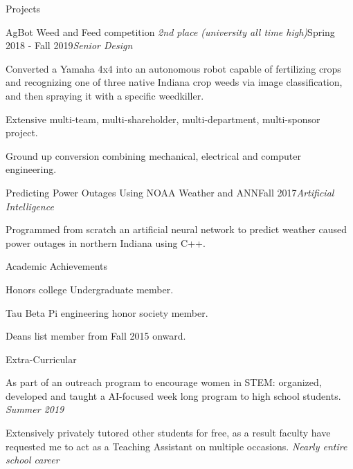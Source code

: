 \documentclass{resume}
\begin{document}
\begin{rSection}{Projects}
\begin{rSubsection}{AgBot Weed and Feed competition \em{2nd place (university all time high)}}{Spring 2018 - Fall 2019}{\em Senior Design}{}
 \item Converted a Yamaha 4x4 into an autonomous robot capable of fertilizing crops and recognizing one of three native Indiana crop weeds via image classification, and then spraying it with a specific weedkiller.
 \item Extensive multi-team, multi-shareholder, multi-department, multi-sponsor project.
 \item Ground up conversion combining mechanical, electrical and computer engineering.
\end{rSubsection}
\begin{rSubsection}{Predicting Power Outages Using NOAA Weather and ANN}{Fall 2017}{\em Artificial Intelligence}{}
 \item Programmed from scratch an artificial neural network to predict weather caused power outages in northern Indiana using C++.
\end{rSubsection}
\end{rSection}
% 
\begin{rSection}{Academic Achievements} 
\item Honors college Undergraduate member.
\item Tau Beta Pi engineering honor society member.
\item Deans list member from Fall 2015 onward.

\end{rSection}

\begin{rSection}{Extra-Curricular} 
\item As part of an outreach program to encourage women in STEM: organized, developed and taught a AI-focused week long program to high school students. \hfill \em{Summer 2019}
\item Extensively privately tutored other students for free, as a result faculty have requested me to act as a Teaching Assistant on multiple occasions. \hfill \em{Nearly entire school career}
\end{rSection}
\end{document}
